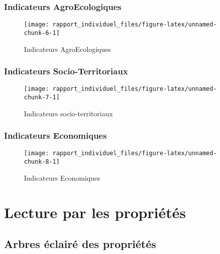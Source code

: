 \documentclass[13pt,]{article}
\begin{document}
\hypertarget{indicateurs-agroecologiques}{%
\subsubsection{Indicateurs
AgroEcologiques}\label{indicateurs-agroecologiques}}

\begin{figure}[H]
\texttt{[image: rapport\_individuel\_files/figure-latex/unnamed-chunk-6-1]} \caption{Indicateurs AgroEcologiques}\label{fig:unnamed-chunk-6}
\end{figure}

\hypertarget{indicateurs-socio-territoriaux}{%
\subsubsection{Indicateurs
Socio-Territoriaux}\label{indicateurs-socio-territoriaux}}

\begin{figure}[H]
\texttt{[image: rapport\_individuel\_files/figure-latex/unnamed-chunk-7-1]} \caption{Indicateurs socio-territoriaux}\label{fig:unnamed-chunk-7}
\end{figure}

\hypertarget{indicateurs-economiques}{%
\subsubsection{Indicateurs Economiques}\label{indicateurs-economiques}}

\begin{figure}[H]
\texttt{[image: rapport\_individuel\_files/figure-latex/unnamed-chunk-8-1]} \caption{Indicateurs Economiques}\label{fig:unnamed-chunk-8}
\end{figure}

\hbox{}

\hypertarget{lecture-par-les-proprietes}{%
\section{Lecture par les propriétés}\label{lecture-par-les-proprietes}}

\hypertarget{arbres-eclaire-des-proprietes}{%
\subsection{Arbres éclairé des
propriétés}\label{arbres-eclaire-des-proprietes}}

\end{document}
